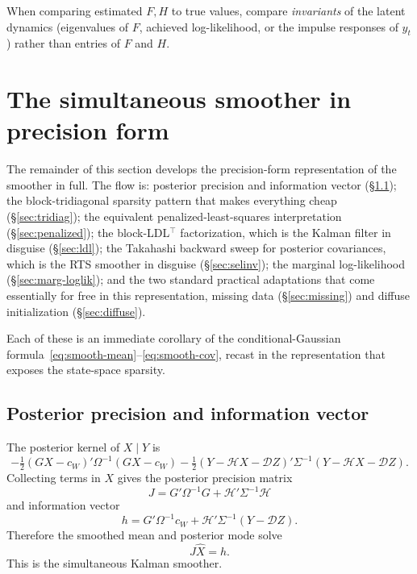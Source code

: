 \documentclass[11pt]{article}
\begin{document}
When comparing estimated $F,H$ to true values, compare \emph{invariants}
of the latent dynamics (eigenvalues of $F$, achieved log-likelihood, or
the impulse responses of $y_t$) rather than entries of $F$ and $H$.

\section{The simultaneous smoother in precision form}
\label{sec:precision-form}

The remainder of this section develops the precision-form
representation of the smoother in full.  The flow is: posterior
precision and information vector (\S\ref{sec:precision-derivation});
the block-tridiagonal sparsity pattern that makes everything cheap
(\S\ref{sec:tridiag}); the equivalent penalized-least-squares
interpretation (\S\ref{sec:penalized}); the block-LDL$^\top$
factorization, which is the Kalman filter in disguise
(\S\ref{sec:ldl}); the Takahashi backward sweep for posterior
covariances, which is the RTS smoother in disguise
(\S\ref{sec:selinv}); the marginal log-likelihood
(\S\ref{sec:marg-loglik}); and the two standard practical adaptations
that come essentially for free in this representation, missing data
(\S\ref{sec:missing}) and diffuse initialization
(\S\ref{sec:diffuse}).

Each of these is an immediate corollary of the conditional-Gaussian
formula~\eqref{eq:smooth-mean}--\eqref{eq:smooth-cov}, recast in the
representation that exposes the state-space sparsity.

\subsection{Posterior precision and information vector}
\label{sec:precision-derivation}

The posterior kernel of $X\mid Y$ is
\begin{equation}
-\tfrac12(GX-c_W)'\Omega^{-1}(GX-c_W)-\tfrac12(Y-\mathcal HX-\mathcal D Z)'\Sigma^{-1}(Y-\mathcal HX-\mathcal D Z).
\end{equation}
Collecting terms in $X$ gives the posterior precision matrix
\begin{equation}
J=G'\Omega^{-1}G+\mathcal H'\Sigma^{-1}\mathcal H
\label{eq:Jdef}
\end{equation}
and information vector
\begin{equation}
h=G'\Omega^{-1}c_W+\mathcal H'\Sigma^{-1}(Y-\mathcal D Z).
\label{eq:hdef}
\end{equation}
Therefore the smoothed mean and posterior mode solve
\begin{equation}
J\widehat X=h.
\label{eq:simks}
\end{equation}
This is the simultaneous Kalman smoother.
\end{document}
